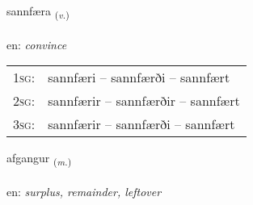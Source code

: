 \documentclass[frontgrid, backgrid]{flacards}\usepackage[]{graphicx}\usepackage[]{xcolor}
\begin{document}
\renewcommand{\flhead}{\vskip5pt \fboxsep=0pt {\small\bfseries\footnotesize Sagnorð | Verb}}
\renewcommand{\fcfoot}{\vskip5pt \fboxsep=0pt \hspace{2pt}{\small\bfseries\footnotesize 3K}}

\renewcommand{\blhead}{\vskip5pt {\small\bfseries\footnotesize Sagnorð | Verb }}
\renewcommand{\bcfoot}{\vskip5pt \hspace{2pt}{\small\bfseries\footnotesize 3K}}


{sannfæra \small{\textsubscript{(\textit{v.})}} \\[1ex] %
\textphonetic{[sanfaira]} \\
en: \emph{convince} \\  [2ex]
\renewcommand*{\arraystretch}{0.8}
\begin{tabular}{p{1cm}l}
\textsc{1sg}: & sannfæri -- sannfærði -- sannfært \\ 
\textsc{2sg}: & sannfærir -- sannfærðir -- sannfært \\ 
\textsc{3sg}: & sannfærir -- sannfærði -- sannfært \\ 
\end{tabular}
}

\renewcommand{\flhead}{\vskip5pt \fboxsep=0pt {\small\bfseries\footnotesize Nafnorð | Noun}}
\renewcommand{\fcfoot}{\vskip5pt \fboxsep=0pt \hspace{2pt}{\small\bfseries\footnotesize 3K}}

\renewcommand{\blhead}{\vskip5pt {\small\bfseries\footnotesize Nafnorð | Noun }}
\renewcommand{\bcfoot}{\vskip5pt \hspace{2pt}{\small\bfseries\footnotesize 3K}}


{afgangur \small{\textsubscript{(\textit{m.})}} \\[1ex] %
\textphonetic{[avkauŋkʏr]} \\
en: \emph{surplus, remainder, leftover} \\  [2ex]
\renewcommand*{\arraystretch}{0.8}
}
\end{document}
